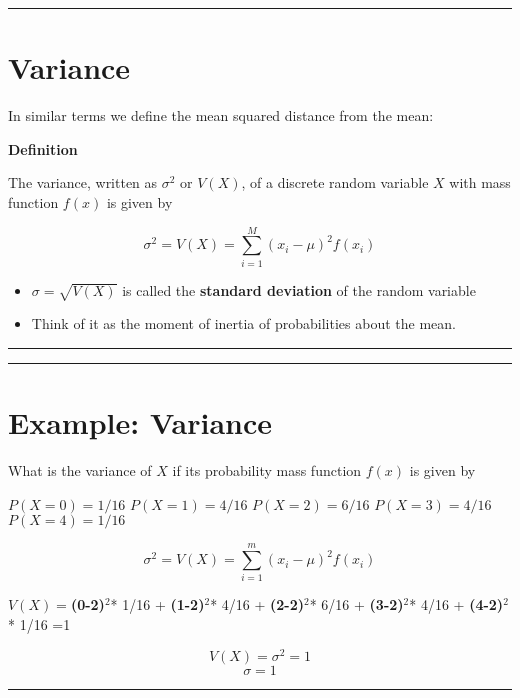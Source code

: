 \documentclass[
]{book}
\begin{document}
\begin{center}\rule{0.5\linewidth}{0.5pt}\end{center}

\hypertarget{variance}{%
\section{Variance}\label{variance}}

In similar terms we define the mean squared distance from the mean:

\textbf{Definition}

The variance, written as \(\sigma^2\) or \(V(X)\), of a discrete random variable \(X\) with mass function \(f(x)\) is given by

\[\sigma^2 = V(X)= \sum_{i=1}^M (x_i-\mu)^2 f(x_i)\]

\begin{itemize}
\item
  \(\sigma=\sqrt{V(X)}\) is called the \textbf{standard deviation} of the random variable
\item
  Think of it as the moment of inertia of probabilities about the mean.
\end{itemize}

\begin{center}\rule{0.5\linewidth}{0.5pt}\end{center}

\begin{center}\rule{0.5\linewidth}{0.5pt}\end{center}

\hypertarget{example-variance}{%
\section{Example: Variance}\label{example-variance}}

What is the variance of \(X\) if its probability mass function \(f(x)\) is given by

\(P(X=0)=1/16\)
\(P(X=1)=4/16\)
\(P(X=2)=6/16\)
\(P(X=3)=4/16\)
\(P(X=4)=1/16\)

\[\sigma^2 =V(X)=\sum_{i=1}^m (x_i-\mu)^2 f(x_i)\]

\(V(X)=\)\textbf{(0-2)}\(^2\)* 1/16 + \textbf{(1-2)}\(^2\)* 4/16 + \textbf{(2-2)}\(^2\)* 6/16 + \textbf{(3-2)}\(^2\)* 4/16 + \textbf{(4-2)}\(^2\)* 1/16 =1

\[V(X)=\sigma^2=1\]
\[\sigma=1\]

\begin{center}\rule{0.5\linewidth}{0.5pt}\end{center}
\end{document}
